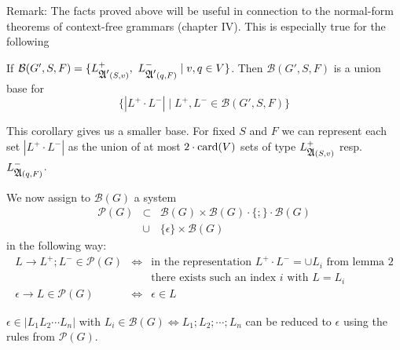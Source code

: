 Remark: The facts proved above will be useful in connection to the normal-form
theorems of context-free grammars (chapter IV). This is especially true for the
following

\begin{corollary}
If $\mathcal{B}(G', S, F) = \{ L^+_{\mbox{$\mathfrak{A'}$}(S, v)},\ L^-_{\mbox{$\mathfrak{A'}$}(q, F)} \mid
v, q \in V \}$. Then $\mathcal{B}(G', S, F)$ is a union base for
\[ \{ |L^+ \cdot L^-| \mid L^+, L^- \in \mathcal{B}(G', S, F) \} \]
\end{corollary}

This corollary gives us a smaller base. For fixed $S$ and $F$ we can represent
each set $|L^+ \cdot L^-|$ as the union of at most $2 \cdot \mathrm{card}(V)$ sets of
type $L^+_{\mbox{$\mathfrak{A}$}(S, v)}$ resp.\ $L^-_{\mbox{$\mathfrak{A}$}(q, F)}$.

We now assign to $\mathcal{B}(G)$ a system 
\begin{eqnarray*} 
\mathcal{P}(G) & \subset & \mathcal{B}(G) \times \mathcal{B}(G)
\cdot \{;\} \cdot \mathcal{B}(G) \\
& \cup & \{ \epsilon \} \times \mathcal{B}(G)
\end{eqnarray*}
in the following way:
\begin{eqnarray*}
L \to L^+ ; L^- \in \mathcal{P}(G) & \iff & \text{in the representation } L^+
  \cdot L^- = \cup L_i \text{ from lemma 2} \\
  & & \text {there exists such an index $i$ with $L = L_i$} \\
\epsilon \to L \in \mathcal{P}(G) & \iff & \epsilon \in L
\end{eqnarray*}

\begin{lemma}
$\epsilon \in |L_1 L_2 \cdots L_n|$ with $L_i \in \mathcal{B}(G) \iff
L_1;L_2;\cdots ;L_n$ can be reduced to $\epsilon$ using the rules from
$\mathcal{P}(G)$.
\end{lemma}

